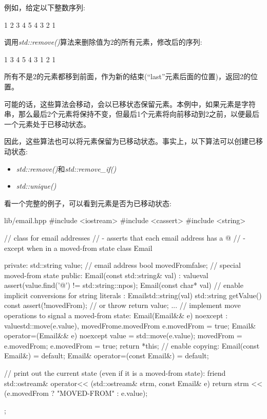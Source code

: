 例如，给定以下整数序列:\par

\begin{myOutput}
1 2 3 4 5 4 3 2 1
\end{myOutput}

调用\textit{std::\allowbreak{}remove(\allowbreak{})\allowbreak{}}算法来删除值为2的所有元素，修改后的序列:\par

\begin{myOutput}
1 3 4 5 4 3 1 2 1
\end{myOutput}

所有不是2的元素都移到前面，作为新的结束(“last”元素后面的位置)，返回2的位置。\par

可能的话，这些算法会移动，会以已移状态保留元素。本例中，如果元素是字符串，那么最后2个元素将保持不变，但最后1个元素将向前移动到2之前，以便最后一个元素处于已移动状态。\par

因此，这些算法也可以将元素保留为已移动状态。事实上，以下算法可以创建已移动状态:\par

\begin{itemize}
  \item \textit{std::\allowbreak{}remove(\allowbreak{})\allowbreak{}}和\textit{std::\allowbreak{}remove\_\allowbreak{}if(\allowbreak{})\allowbreak{}}
  \item \textit{std::\allowbreak{}unique(\allowbreak{})\allowbreak{}}
\end{itemize}

看一个完整的例子，可以看到元素是否为已移动状态:\par

\begin{codeboxt}[cpp]{lib/email.hpp}
#include <iostream>
#include <cassert>
#include <string>

// class for email addresses
// - asserts that each email address has a @
// - except when in a moved-from state
class Email {
  private:
  std::string value; // email address
  bool movedFrom{false}; // special moved-from state
  public:
  Email(const std::string& val)
  : value{val} {
    assert(value.find('@') != std::string::npos);
  }
  Email(const char* val) // enable implicit conversions for string literals
  : Email{std::string(val)} {
  }
  std::string getValue() const {
    assert(!movedFrom); // or throw
    return value;
  }
  ...
  // implement move operations to signal a moved-from state:
  Email(Email&& e) noexcept
  : value{std::move(e.value)}, movedFrom{e.movedFrom} {
    e.movedFrom = true;
  }
  Email& operator=(Email&& e) noexcept {
    value = std::move(e.value);
    movedFrom = e.movedFrom;
    e.movedFrom = true;
    return *this;
  }
  // enable copying:
  Email(const Email&) = default;
  Email& operator=(const Email&) = default;

  // print out the current state (even if it is a moved-from state):
  friend std::ostream& operator<< (std::ostream& strm, const Email& e) {
    return strm << (e.movedFrom ? "MOVED-FROM" : e.value);
  }
};
\end{codeboxt}

